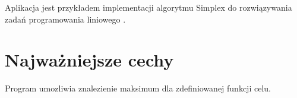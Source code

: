 \-Aplikacja jest przykładem implementacji algorytmu \-Simplex do rozwiązywania zadań programowania liniowego .\hypertarget{index_etykieta-wazne-cechy}{}\section{\-Najważniejsze cechy}\label{index_etykieta-wazne-cechy}
\-Program umozliwia znalezienie maksimum dla zdefiniowanej funkcji celu. 